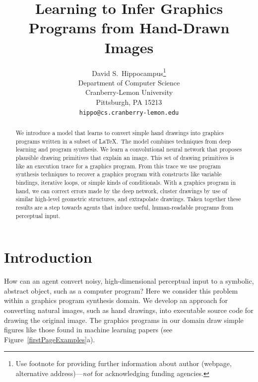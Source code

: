 \documentclass{article}
\title{Learning to Infer Graphics Programs from Hand-Drawn Images}
\author{
  David S.~Hippocampus\thanks{Use footnote for providing further
    information about author (webpage, alternative
    address)---\emph{not} for acknowledging funding agencies.} \\
  Department of Computer Science\\
  Cranberry-Lemon University\\
  Pittsburgh, PA 15213 \\
  \texttt{hippo@cs.cranberry-lemon.edu} \\
}
\newcommand{\remark}[1]{\textcolor{red}{[#1]}}
\begin{document}

\maketitle

\begin{abstract}
  We introduce a model that learns to convert simple hand drawings
  into graphics programs written in a subset of \LaTeX.~The model
  combines techniques from deep learning and program synthesis.  We
  learn a convolutional neural network that proposes plausible drawing primitives
  that explain an image. This set of drawing primitives is like an execution trace for a graphics program. From this trace we use
  program synthesis techniques to recover a graphics
  program with constructs like variable bindings, iterative loops, or
  simple kinds of conditionals. With a graphics program in hand,
  we can correct errors made by the deep network, cluster drawings by use of similar high-level geometric structures, and extrapolate drawings.
  Taken together these results are a step towards
  agents that induce useful, human-readable programs from perceptual input.  
\end{abstract}

\section{Introduction}

 How can an agent convert noisy, high-dimensional perceptual input
 to a symbolic, abstract object, such as a computer program?  Here we
 consider this problem within a graphics program synthesis domain.  We
 develop an approach for converting natural images, such as hand
 drawings, into executable source code for drawing the original image.
 The graphics programs in our domain draw simple figures like those found in
 machine learning papers (see Figure~\ref{firstPageExamples}a).
\end{document}
